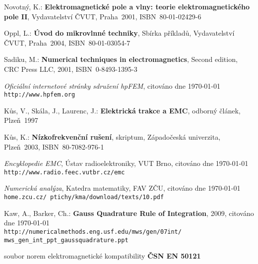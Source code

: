 
%


\begin{thebibliography}{9}
{\sc Novotný, K.:}  {\bf Elektromagnetické pole a vlny: teorie elektromagnetického pole II},
Vydavatelství ČVUT, Praha~2001, \mbox{ISBN 80-01-02429-6}

{\sc Oppl, L.:}  {\bf Úvod do mikrovlnné techniky},
Sbírka příkladů, Vydavatelství ČVUT, Praha~2004, \mbox{ISBN 80-01-03054-7}

{\sc Sadiku, M.:} {\bf Numerical techniques in electromagnetics},
Second edition, CRC Press LLC, 2001, \mbox{ISBN 0-8493-1395-3}

{\em Oficiální internetové stránky sdružení hpFEM},
citováno dne \today \\
\texttt{http://www.hpfem.org}

{\sc Kůs, V., Skála, J., Laurenc, J.:}  {\bf Elektrická trakce a EMC},
odborný článek, Plzeň~1997

{\sc Kůs, K.:}  {\bf Nízkofrekvenční rušení},
skriptum, Západočeská univerzita, Plzeň~2003, \mbox{ISBN 80-7082-976-1}

{\em Encyklopedie EMC}, Ústav radioelektroniky, VUT Brno,
citováno dne \today \\
\texttt{http://www.radio.feec.vutbr.cz/emc}

{\em Numerická analýza}, Katedra matematiky, FAV ZČU,
citováno dne \today \\
\texttt{home.zcu.cz/~ptichy/kma/download/texts/10.pdf}

{\sc Kaw, A., Barker, Ch.:} {\bf Gauss Quadrature Rule of Integration}, 2009, 
citováno dne \today \\
\texttt{http://numericalmethods.eng.usf.edu/mws/gen/07int/\\mws\_gen\_int\_ppt\_gaussquadrature.ppt
}

soubor norem elektromagnetické kompatibility  {\bf ČSN EN 50121}

\end{thebibliography}

